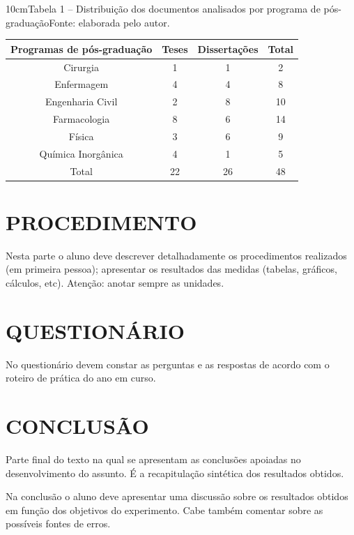 \begin{container}{10cm}{Tabela 1 – Distribuição dos documentos analisados por programa de pós-graduação}{Fonte: elaborada pelo autor.}
\begin{center}
\begin{tabular}{ | c | c | c | c | }
    \hline
    Programas de pós-graduação & Teses & Dissertações & Total\\
    \hline
    \hline
    Cirurgia & 1 & 1 & 2 \\
    \hline
    Enfermagem & 4 & 4 & 8 \\
    \hline
    Engenharia Civil & 2 & 8 & 10 \\
    \hline
    Farmacologia & 8 & 6 & 14 \\
    \hline
    Física & 3 & 6 & 9 \\
    \hline
    Química Inorgânica & 4 & 1 & 5 \\
    \hline
    Total & 22 & 26 & 48 \\
    \hline
\end{tabular} 
\end{center}
\end{container}

\section{PROCEDIMENTO}
Nesta parte o aluno deve descrever detalhadamente os procedimentos realizados (em primeira pessoa); apresentar os resultados das medidas (tabelas, gráficos, cálculos, etc). Atenção: anotar sempre as unidades.


\section{QUESTIONÁRIO}
No questionário devem constar as perguntas e as respostas de acordo com o roteiro de prática do ano em curso. 


\section{CONCLUSÃO}
Parte final do texto na qual se apresentam as conclusões apoiadas no desenvolvimento do assunto. É a recapitulação sintética dos resultados obtidos. 

Na conclusão o aluno deve apresentar uma discussão sobre os resultados obtidos em função dos objetivos do experimento. Cabe também comentar sobre as possíveis fontes de erros.

\newpage

